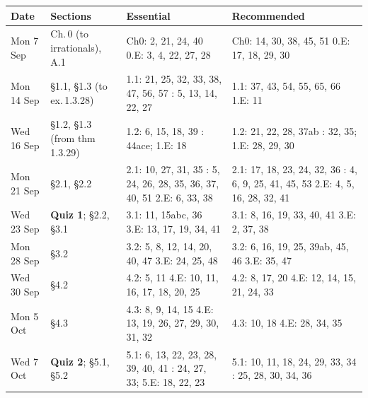 {\sffamily\small
\begin{tabularx}{\linewidth}{@{}l l X X@{}}
\toprule
\textbf{Date} & \textbf{Sections} & \textbf{Essential} & \textbf{Recommended}\\
\midrule
Mon 7 Sep & Ch.\,0 (to irrationals), A.1 & Ch0: 2, 21, 24, 40 \newline 0.E: 3, 4, 22, 27, 28 & Ch0: 14, 30, 38, 45, 51 \newline 0.E: 17, 18, 29, 30\\
Mon 14 Sep & \S1.1, \S1.3 (to ex.\,1.3.28) & 1.1: 21, 25, 32, 33, 38, 47, 56, 57 \newline 1.3: 5, 13, 14, 22, 27 & 1.1: 37, 43, 54, 55, 65, 66 \newline 1.E: 11\\
Wed 16 Sep & \S1.2, \S1.3 (from thm\,1.3.29) & 1.2: 6, 15, 18, 39 \newline 1.3: 44ace; 1.E: 18 & 1.2: 21, 22, 28, 37ab \newline 1.3: 32, 35; 1.E: 28, 29, 30\\
Mon 21 Sep & \S2.1, \S2.2 & 2.1: 10, 27, 31, 35 \newline 2.2: 5, 24, 26, 28, 35, 36, 37, 40, 51 \newline 2.E: 6, 33, 38 & 2.1: 17, 18, 23, 24, 32, 36 \newline 2.2: 4, 6, 9, 25, 41, 45, 53 \newline 2.E: 4, 5, 16, 28, 32, 41\\
Wed 23 Sep & \textbf{Quiz 1}; \S2.2, \S3.1 & 3.1: 11, 15abc, 36 \newline 3.E: 13, 17, 19, 34, 41 & 3.1: 8, 16, 19, 33, 40, 41 \newline 3.E: 2, 37, 38\\
Mon 28 Sep & \S3.2 & 3.2: 5, 8, 12, 14, 20, 40, 47 \newline 3.E: 24, 25, 48 & 3.2: 6, 16, 19, 25, 39ab, 45, 46 \newline 3.E: 35, 47\\
Wed 30 Sep & \S4.2 & 4.2: 5, 11 \newline 4.E: 10, 11, 16, 17, 18, 20, 25 & 4.2: 8, 17, 20 \newline 4.E: 12, 14, 15, 21, 24, 33\\
Mon 5 Oct & \S4.3 & 4.3: 8, 9, 14, 15 \newline 4.E: 13, 19, 26, 27, 29, 30, 31, 32 & 4.3: 10, 18 \newline 4.E: 28, 34, 35\\
Wed 7 Oct & \textbf{Quiz 2}; \S5.1, \S5.2 & 5.1: 6, 13, 22, 23, 28, 39, 40, 41 \newline 5.2: 24, 27, 33; 5.E: 18, 22, 23 & 5.1: 10, 11, 18, 24, 29, 33, 34 \newline 5.2: 25, 28, 30, 34, 36\\
\bottomrule
\end{tabularx}}

